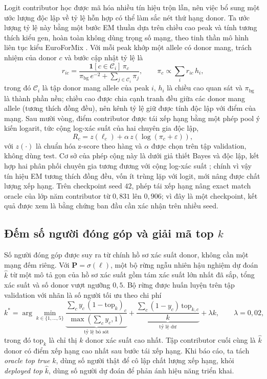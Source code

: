 \documentclass[12pt,a4paper]{article}
\begin{document}
Logit contributor học được mã hóa nhiều tín hiệu trộn lẫn, nên việc bổ sung một ước lượng độc lập về tỷ lệ hỗn hợp có thể làm sắc nét thứ hạng donor. Ta ước lượng tỷ lệ này bằng một bước EM thuần dựa trên chiều cao peak và tính tương thích kiểu gen, hoàn toàn không dùng trọng số mạng, theo tinh thần mô hình liên tục kiểu EuroForMix \cite{bleka2016}. Với mỗi peak khớp một allele có donor mang, trách nhiệm của donor \(c\) và bước cập nhật tỷ lệ là
\begin{equation}
r_{ic}=\frac{\mathbf{1}[c\in\mathcal{C}_i]\,\pi_c}{\pi_{\mathrm{bg}}\,e^{-2}+\sum_{j\in\mathcal{C}_i}\pi_j},
\qquad
\pi_c\propto\sum_i r_{ic}\,h_i,
\end{equation}
trong đó \(\mathcal{C}_i\) là tập donor mang allele của peak \(i\), \(h_i\) là chiều cao quan sát và \(\pi_{\mathrm{bg}}\) là thành phần nền; chiều cao được chia cạnh tranh đều giữa các donor mang allele (tương thích đồng đều), nên kênh tỷ lệ giữ được tính độc lập với điểm của mạng. Sau mười vòng, điểm contributor được tái xếp hạng bằng một phép pool ý kiến logarit, tức cộng log-xác suất của hai chuyên gia độc lập,
\begin{equation}
R_c=z(\ell_c)+\alpha\,z\!\left(\log(\pi_c+\varepsilon)\right),
\end{equation}
với \(z(\cdot)\) là chuẩn hóa z-score theo hàng và \(\alpha\) được chọn trên tập validation, không dùng test. Cơ sở của phép cộng này là dưới giả thiết Bayes và độc lập, kết hợp hai phân phối chuyên gia tương đương với cộng log-xác suất \cite{hinton2002}; chính vì vậy tín hiệu EM tương thích đồng đều, vốn ít trùng lặp với logit, mới nâng được chất lượng xếp hạng. Trên checkpoint seed \(42\), phép tái xếp hạng nâng exact match oracle của lớp năm contributor từ \(0{,}831\) lên \(0{,}906\); vì đây là một checkpoint, kết quả được xem là bằng chứng ban đầu cần xác nhận trên nhiều seed.

\subsection{Đếm số người đóng góp và giải mã top \(k\)}

Số người đóng góp được suy ra từ chính hồ sơ xác suất donor, không cần một mạng đếm riêng. Với \(\bm{P}=\sigma(\bm{\ell})\), một bộ rừng ngẫu nhiên hậu nghiệm dự đoán \(\hat{k}\) từ một mô tả gọn của hồ sơ xác suất gồm tám xác suất lớn nhất đã sắp, tổng xác suất và số donor vượt ngưỡng \(0{,}5\). Bộ rừng được huấn luyện trên tập validation với nhãn là số người tối ưu theo chi phí
\begin{equation}
k^{*}=\arg\min_{k\in\{1,\dots,5\}}
\underbrace{\frac{\sum_c y_c\,(1-\mathrm{top}_k)_c}{\max(\sum_c y_c,1)}}_{\text{tỷ lệ bỏ sót}}
+\underbrace{\frac{\sum_c(1-y_c)\,\mathrm{top}_{k,c}}{k}}_{\text{tỷ lệ dư}}
+\lambda k,\qquad \lambda=0{,}02,
\end{equation}
trong đó \(\mathrm{top}_k\) là chỉ thị \(k\) donor xác suất cao nhất. Tập contributor cuối cùng là \(\hat{k}\) donor có điểm xếp hạng cao nhất sau bước tái xếp hạng. Khi báo cáo, ta tách \emph{oracle top true} \(k\), dùng số người thật để cô lập chất lượng xếp hạng, khỏi \emph{deployed top} \(\hat{k}\), dùng số người dự đoán để phản ánh hiệu năng triển khai.
\end{document}
